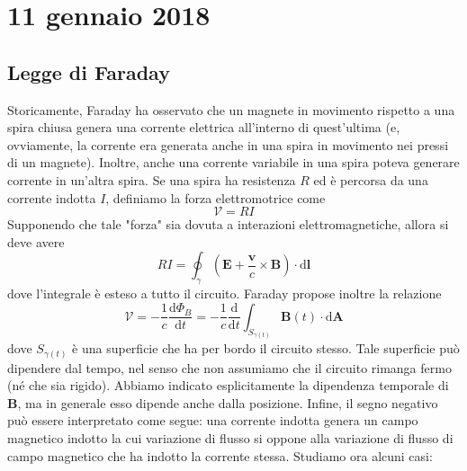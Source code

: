 \documentclass[a4paper,11pt]{book}
\newcommand{\dif}{\mathrm{d}}
\renewcommand{\vec}[1]{\mathbf{#1}}
\theoremstyle{theorem}
\theoremstyle{definition}
\begin{document}
\section{11 gennaio 2018}
\subsection{Legge di Faraday}
Storicamente, Faraday ha osservato che un magnete in movimento rispetto a una spira chiusa genera una corrente elettrica all'interno di quest'ultima (e, ovviamente, la corrente era generata anche in una spira in movimento nei pressi di un magnete). Inoltre, anche una corrente variabile in una spira poteva generare corrente in un'altra spira. Se una spira ha resistenza $R$ ed è percorsa da una corrente indotta $I$, definiamo la forza elettromotrice come
\[\mathcal{V}=RI\]
Supponendo che tale "forza" sia dovuta a interazioni elettromagnetiche, allora si deve avere
\[RI=\oint_{\gamma}\left(\vec{E}+\frac{\vec{v}}{c}\times\vec{B}\right)\cdot\dif\vec{l}\]
dove l'integrale è esteso a tutto il circuito. Faraday propose inoltre la relazione
\[\mathcal{V}=-\frac{1}{c}\frac{\dif\Phi_B}{\dif t}=-\frac{1}{c}\frac{\dif }{\dif t}\int_{S_{\gamma(t)}}\vec{B}(t)\cdot\dif\vec{A}\]
dove $S_{\gamma(t)}$ è una superficie che ha per bordo il circuito stesso. Tale superficie può dipendere dal tempo, nel senso che non assumiamo che il circuito rimanga fermo (né che sia rigido). Abbiamo indicato esplicitamente la dipendenza temporale di $\vec{B}$, ma in generale esso dipende anche dalla posizione. Infine, il segno negativo può essere interpretato come segue: una corrente indotta genera un campo magnetico indotto la cui variazione di flusso si oppone alla variazione di flusso di campo magnetico che ha indotto la corrente stessa. Studiamo ora alcuni casi:
\end{document}
